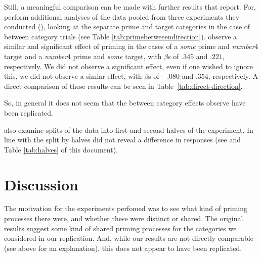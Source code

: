 \documentclass[10pt]{article}
\begin{document}
\begin{multicols}{2}
Still, a meaningful comparison can be made with further results that \citeauthor{Bott:2016aa} report.
For, \citeauthor{Bott:2016aa}  perform additional analyses of the data pooled from three experiments they conducted (\citeyear[132--133]{Bott:2016aa}), looking at the separate prime and target categories in the case of between category trials (see Table \ref{tab:primebetweeendirection}).
\citeauthor{Bott:2016aa} observe a similar and significant effect of priming in the cases of a \emph{some} prime and \emph{number}4 target and a \emph{number}4 prime and \emph{some} target, with \(\beta\)s of \(.345\) and \(.221\), respectively.
We did not observe a significant effect, even if one wished to ignore this, we did not observe a simlar effect, with \(\beta\)s of \(-.080\) and \(.354\), respectively.
A direct comparison of these results can be seen in Table~\ref{tab:direct-direction}.

So, in general it does not seem that the between category effects \citeauthor{Bott:2016aa} observe have been replicated.

\citeauthor{Bott:2016aa} also examine splits of the data into first and second halves of the experiment.
In line with \citeauthor{Bott:2016aa} the split by halves did not reveal a difference in responses (see \textcite[Table 4, 134]{Bott:2016aa} and Table \ref{tab:halves} of this document).

\section{Discussion}
\label{sec:discussion}


The motivation for the experiments \citeauthor{Bott:2016aa} perfomed was to see what kind of priming processes there were, and whether these were distinct or shared.
The original results suggest some kind of shared priming processes for the categories we considered in our replication.
And, while our results are not directly comparable (see above for an explanation), this does not appear to have been replicated.


\end{multicols}
\end{document}

